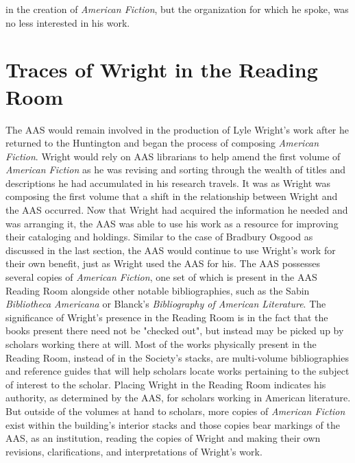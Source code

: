 in the creation of \textit{American Fiction}, but the organization for which he spoke, was no less interested in his work.

\section{Traces of Wright in the Reading Room}

The AAS would remain involved in the production of Lyle Wright's work after he returned to the Huntington and began the process of composing \textit{American Fiction}. Wright would rely on AAS librarians to help amend the first volume of \textit{American Fiction} as he was revising and sorting through the wealth of titles and descriptions he had accumulated in his research travels. It was as Wright was composing the first volume that a shift in the relationship between Wright and the AAS occurred. Now that Wright had acquired the information he needed and was arranging it, the AAS was able to use his work as a resource for improving their cataloging and holdings. Similar to the case of Bradbury Osgood as discussed in the last section, the AAS would continue to use Wright's work for their own benefit, just as Wright used the AAS for his. The AAS possesses several copies of \textit{American Fiction}, one set of which is present in the AAS Reading Room alongside other notable bibliographies, such as the Sabin \textit{Bibliotheca Americana} or Blanck's \textit{Bibliography of American Literature}. The significance of Wright's presence in the Reading Room is in the fact that the books present there need not be "checked out", but instead may be picked up by scholars working there at will. Most of the works physically present in the Reading Room, instead of in the Society's stacks, are multi-volume bibliographies and reference guides that will help scholars locate works pertaining to the subject of interest to the scholar. Placing Wright in the Reading Room indicates his authority, as determined by the AAS, for scholars working in American literature. But outside of the volumes at hand to scholars, more copies of \textit{American Fiction} exist within the building's interior stacks and those copies bear markings of the AAS, as an institution, reading the copies of Wright and making their own revisions, clarifications, and interpretations of Wright's work. 

